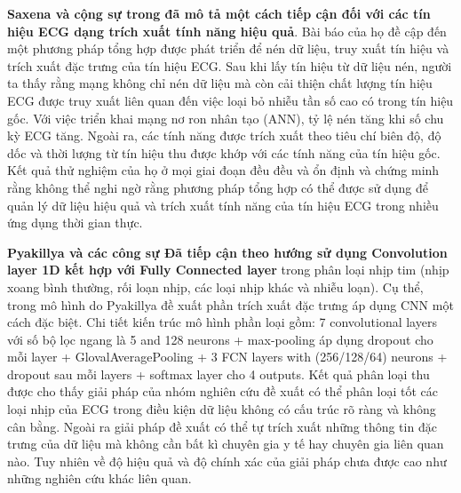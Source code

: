 \textbf{Saxena và cộng sự trong \cite{classify} đã mô tả một cách tiếp cận đối với các tín hiệu ECG dạng trích xuất tính năng hiệu quả}. Bài báo của họ đề cập đến một phương pháp tổng hợp được phát triển để nén dữ liệu, truy xuất tín hiệu và trích xuất đặc trưng của tín hiệu ECG. Sau khi lấy tín hiệu từ dữ liệu nén, người ta thấy rằng mạng không chỉ nén dữ liệu mà còn cải thiện chất lượng tín hiệu ECG được truy xuất liên quan đến việc loại bỏ nhiễu tần số cao có trong tín hiệu gốc. Với việc triển khai mạng nơ ron nhân tạo (ANN), tỷ lệ nén tăng khi số chu kỳ ECG tăng. Ngoài ra, các tính năng được trích xuất theo tiêu chí biên độ, độ dốc và thời lượng từ tín hiệu thu được khớp với các tính năng của tín hiệu gốc. Kết quả thử nghiệm của họ ở mọi giai đoạn đều đều và ổn định và chứng minh rằng không thể nghi ngờ rằng phương pháp tổng hợp có thể được sử dụng để quản lý dữ liệu hiệu quả và trích xuất tính năng của tín hiệu ECG trong nhiều ứng dụng thời gian thực.\par

\textbf{Pyakillya và các công sự \cite{cnn1d} Đã tiếp cận theo hướng sử dụng Convolution layer 1D kết hợp với Fully Connected layer} trong phân loại nhịp tim (nhịp xoang bình thường, rối loạn nhịp, các loại nhịp khác và nhiễu loạn). Cụ thể, trong mô hình do Pyakillya đề xuất phần trích xuất đặc trưng áp dụng CNN một cách đặc biệt. Chi tiết kiến trúc mô hình phần loại gồm: 7 convolutional layers với số bộ lọc ngang là 5 and 128 neurons + max-pooling áp dụng dropout cho mỗi layer + GlovalAveragePooling + 3 FCN layers with (256/128/64) neurons + dropout sau mỗi layers + softmax layer cho 4 outputs. Kết quả phân loại thu được cho thấy giải pháp của nhóm nghiên cứu đề xuất có thể phân loại tốt các loại nhịp của ECG trong điều kiện dữ liệu không có cấu trúc rõ ràng và không cân bằng. Ngoài ra giải pháp đề xuất có thể tự trích xuất những thông tin đặc trưng của dữ liệu mà không cần bất kì chuyên gia y tế hay chuyên gia liên quan nào. Tuy nhiên về độ hiệu quả và độ chính xác của giải pháp chưa được cao như những nghiên cứu khác liên quan.


